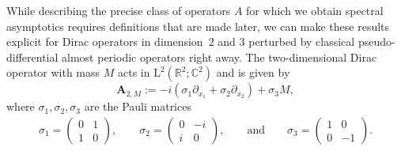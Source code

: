 \documentclass[AHL,Unicode,longabstracts,published]{cedram}
\newcommand{\RL}{\mathrm{L}}
\newcommand{\R}{\mathbb R}
\newcommand{\C}{\mathbb C}
\newcommand{\BA}{\mathbf A}
\newcommand{\del}{\partial}
\begin{document}
While describing the precise class of operators $A$ for which we obtain spectral asymptotics requires definitions that are made later, we can make these results explicit for Dirac operators in dimension~$2$ and $3$ perturbed by classical pseudo-differential almost periodic operators right away. The two-dimensional Dirac operator with mass $M$ acts in $\RL^2(\R^2;\C^2)$ and is given by
\begin{equation}
\BA_{2,M} := -i(\sigma_1 \del_{x_1} + \sigma_2 \del_{x_2}) + \sigma_3 M,
\end{equation}
where $\sigma_1, \sigma_2,
\sigma_3$ are the Pauli matrices
\begin{align}
\sigma_1=
\begin{pmatrix}
0 & 1\\
1 & 0
\end{pmatrix},\qquad
\sigma_2=
\begin{pmatrix}
0 & -i\\
i & 0
\end{pmatrix},\qquad \text{and} \qquad
\sigma_3=
\begin{pmatrix}
1 & 0\\
0 & -1
\end{pmatrix}.
\end{align}
\end{document}
